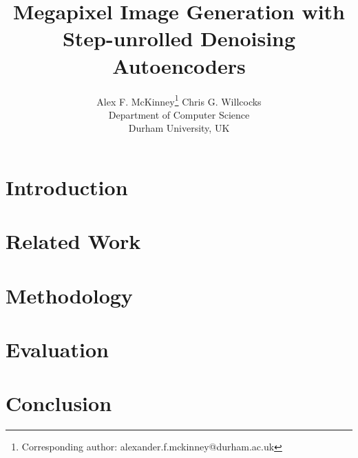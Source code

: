 \documentclass[10pt,twocolumn,letterpaper]{article}
\begin{document}
\title{Megapixel Image Generation with Step-unrolled Denoising Autoencoders}


\author{Alex F. McKinney\thanks{Corresponding author: alexander.f.mckinney@durham.ac.uk} \hspace{4px} Chris G. Willcocks\\
Department of Computer Science\\
Durham University, UK\\
}

\maketitle

\begin{abstract}
    
\end{abstract}

\section{Introduction}
\label{sec:intro}


\section{Related Work}
\label{sec:related}


\section{Methodology}
\label{sec:method}


\section{Evaluation}
\label{sec:evaluation}


\section{Conclusion}
\label{sec:conclusion}


{\small


}
\end{document}
